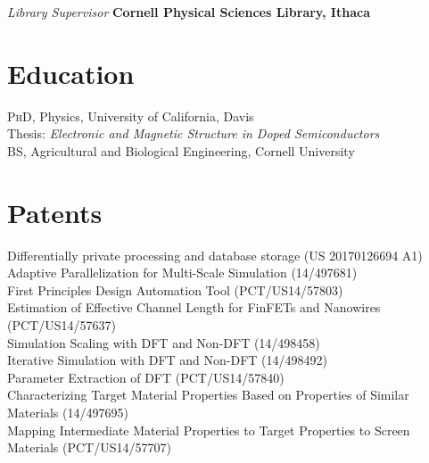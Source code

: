 \documentclass[11pt, a4paper]{article}
\newcommand{\years}[1]{\marginnote{\scriptsize #1}}
\begin{document}
\years{2000-2004}\emph{Library Supervisor }\textbf{Cornell Physical Sciences Library, Ithaca}%

\section*{{\color{mycolor4}\textbf{Education}}}
\noindent
\years{2011}\textsc{PhD}, Physics, University of California, Davis\\
\indent Thesis: \textit{Electronic and Magnetic Structure in Doped Semiconductors}\\
\years{2004}\textsc{BS}, Agricultural and Biological Engineering, Cornell University\\




\section*{{\color{mycolor4}\textbf{Patents}}}
\noindent
Differentially private processing and database storage (US 20170126694 A1) \\
Adaptive Parallelization for Multi-Scale Simulation (14/497681) \\
First Principles Design Automation Tool (PCT/US14/57803) \\
Estimation of Effective Channel Length for FinFETs and Nanowires (PCT/US14/57637) \\
Simulation Scaling with DFT and Non-DFT (14/498458) \\
Iterative Simulation with DFT and Non-DFT (14/498492) \\
Parameter Extraction of DFT (PCT/US14/57840) \\
Characterizing Target Material Properties Based on Properties of Similar Materials (14/497695) \\
Mapping Intermediate Material Properties to Target Properties to Screen Materials (PCT/US14/57707)\\
\end{document}
